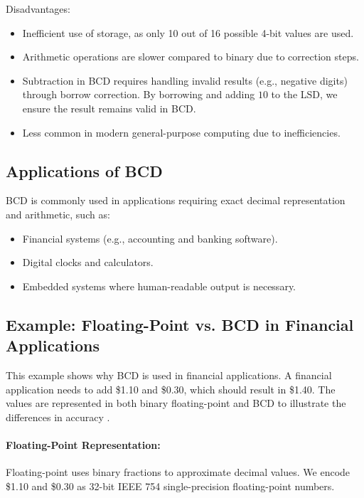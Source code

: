 \vspace{\baselineskip}\par    
\noindent Disadvantages:
    \begin{itemize}
        \item Inefficient use of storage, as only 10 out of 16 possible 4-bit values are used.
        \item Arithmetic operations are slower compared to binary due to correction steps.
        \item Subtraction in BCD requires handling invalid results (e.g., negative digits) through borrow correction. By borrowing and adding \( 10 \) to the LSD, we ensure the result remains valid in BCD.
        \item Less common in modern general-purpose computing due to inefficiencies.
    \end{itemize}

\subsection{Applications of BCD}
BCD is commonly used in applications requiring exact decimal representation and arithmetic, such as:
\begin{itemize}
    \item Financial systems (e.g., accounting and banking software).
    \item Digital clocks and calculators.
    \item Embedded systems where human-readable output is necessary.
\end{itemize}

\subsection{Example: Floating-Point vs. BCD in Financial Applications}
This example shows why BCD is used in financial applications. A financial application needs to add \$1.10 and \$0.30, which should result in \$1.40. The values are represented in both binary floating-point  and BCD to illustrate the differences in accuracy \cite{goldberg1991}.

\paragraph{Floating-Point Representation:}
Floating-point uses binary fractions to approximate decimal values. We encode \$1.10 and \$0.30 as 32-bit IEEE 754 single-precision floating-point numbers.

